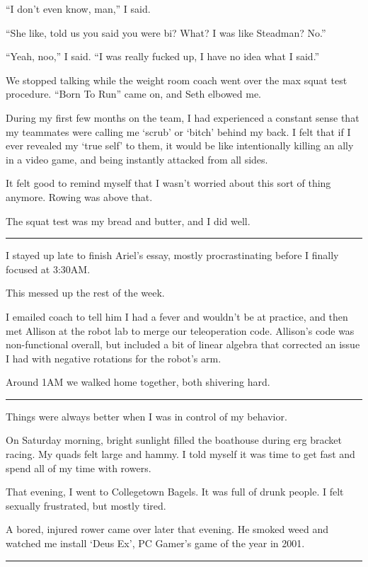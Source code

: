 ``I don't even know, man,'' I said.

``She like, told us you said you were bi?  What?  I was like Steadman?
No.''

``Yeah, noo,'' I said. ``I was really fucked up, I have no idea what I said.''

We stopped talking while the weight room coach went over the max squat test
procedure.  ``Born To Run'' came on, and Seth elbowed me.

During my first few months on the team, I had experienced a constant sense that
my teammates were calling me `scrub' or `bitch' behind my back.  I felt that if
I ever revealed my `true self' to them, it would be like intentionally killing
an ally in a video game, and being instantly attacked from all sides.

It felt good to remind myself that I wasn't worried about this sort of thing
anymore.  Rowing was above that.

The squat test was my bread and butter, and I did well.

\plainfancybreak{12pt}{2}{}

I stayed up late to finish Ariel's essay, mostly procrastinating before I
finally focused at 3:30AM.

This messed up the rest of the week.

I emailed coach to tell him I had a fever and wouldn't be at practice, and then
met Allison at the robot lab to merge our teleoperation code.   Allison's code
was non-functional overall, but included a bit of linear algebra that corrected
an issue I had with negative rotations for the robot's arm.

Around 1AM we walked home together, both shivering hard.

\plainfancybreak{12pt}{2}{}

Things were always better when I was in control of my behavior.

On Saturday morning, bright sunlight filled the boathouse during erg bracket
racing.  My quads felt large and hammy.  I told myself it was time to get fast
and spend all of my time with rowers.

That evening, I went to Collegetown Bagels.  It was full of drunk people.  I
felt sexually frustrated, but mostly tired.

A bored, injured rower came over later that evening.  He smoked weed and watched
me install `Deus Ex', PC Gamer's game of the year in 2001.

\plainfancybreak{12pt}{2}{}

